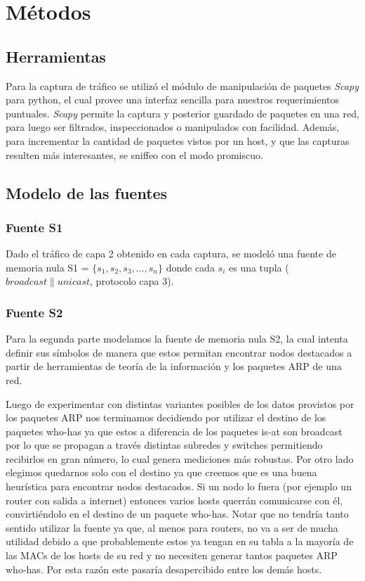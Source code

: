 \section{Métodos}
\subsection*{Herramientas}
Para la captura de tráfico se utilizó el módulo de manipulación de paquetes \emph{Scapy} para python, el cual provee una interfaz sencilla para nuestros requerimientos puntuales. \emph{Scapy} permite la captura y posterior guardado de paquetes en una red, para luego ser filtrados, inspeccionados o manipulados con facilidad. Además, para incrementar la cantidad de paquetes vistos por un host, y que las capturas resulten más interesantes, se sniffeo con el modo promiscuo.

\subsection*{Modelo de las fuentes}

\subsubsection*{Fuente S1}
Dado el tráfico de capa 2 obtenido en cada captura, se modeló una fuente de memoria nula S1 = $ \{ s_{1}, s_{2}, s_{3},...,s_{n} \}$ donde cada $ s_{i} $ es una tupla ($broadcast \| unicast$, protocolo capa 3).

\subsubsection*{Fuente S2}
Para la segunda parte modelamos la fuente de memoria nula S2, la cual intenta definir sus símbolos de manera que estos permitan encontrar nodos destacados a partir de herramientas de teoría de la información y los paquetes ARP de una red.

Luego de experimentar con distintas variantes posibles de los datos provistos por los paquetes ARP nos terminamos decidiendo por utilizar el destino de los paquetes who-has ya que estos a diferencia de los paquetes is-at son broadcast por lo que se propagan a través distintas subredes y switches permitiendo recibirlos en gran número, lo cual genera mediciones más robustas. Por otro lado elegimos quedarnos solo con el destino ya que creemos que es una buena heurística para encontrar nodos destacados. Si un nodo lo fuera (por ejemplo un router con salida a internet) entonces varios hosts querrán comunicarse con él, convirtiéndolo en el destino de un paquete who-has. Notar que no tendría tanto sentido utilizar la fuente ya que, al menos para routers, no va a ser de mucha utilidad debido a que probablemente estos ya tengan en su tabla a la mayoría de las MACs de los hosts de su red y no necesiten generar tantos paquetes ARP who-has. Por esta razón este pasaría desapercibido entre los demás hosts.

